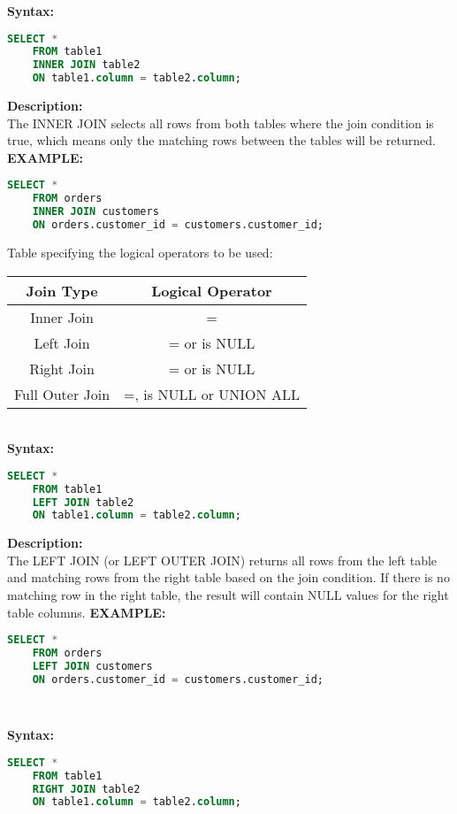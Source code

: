 \documentclass{article}
\begin{document}
\textbf{Syntax:}
\begin{lstlisting}[language=SQL]
    SELECT * 
    FROM table1
    INNER JOIN table2 
    ON table1.column = table2.column;

\end{lstlisting}
\textbf{Description:}\\
The INNER JOIN selects all rows from both tables where the join condition is true, which means only the matching rows between the tables will be returned.
\textbf{EXAMPLE:}
\begin{lstlisting}[language=SQL]
    SELECT *
    FROM orders
    INNER JOIN customers 
    ON orders.customer_id = customers.customer_id;

\end{lstlisting}
Table specifying the logical operators to be used:
\begin{table}[h!]
\centering
\begin{tabular}{|c|c|}
    \hline
    \textbf{Join Type} & \textbf{Logical Operator}\\
    \hline
    Inner Join & =\\
    \hline
    Left Join & = or is NULL\\
    \hline
    Right Join & = or is NULL\\
    \hline
    Full Outer Join & =, is NULL or UNION ALL\\
    \hline
\end{tabular}
\end{table}\\
\vspace{20pt}
\textbf{Syntax:}
\begin{lstlisting}[language=SQL]
    SELECT * 
    FROM table1
    LEFT JOIN table2 
    ON table1.column = table2.column;

\end{lstlisting}
\textbf{Description:}\\
The LEFT JOIN (or LEFT OUTER JOIN) returns all rows from the left table and matching rows from the right table based on the join condition. If there is no matching row in the right table, the result will contain NULL values for the right table columns.
\textbf{EXAMPLE:}
\begin{lstlisting}[language=SQL]
    SELECT *
    FROM orders
    LEFT JOIN customers 
    ON orders.customer_id = customers.customer_id;

    
\end{lstlisting}
\textbf{Syntax:}
\begin{lstlisting}[language=SQL]
    SELECT * 
    FROM table1
    RIGHT JOIN table2 
    ON table1.column = table2.column;

\end{lstlisting}
\end{document}
